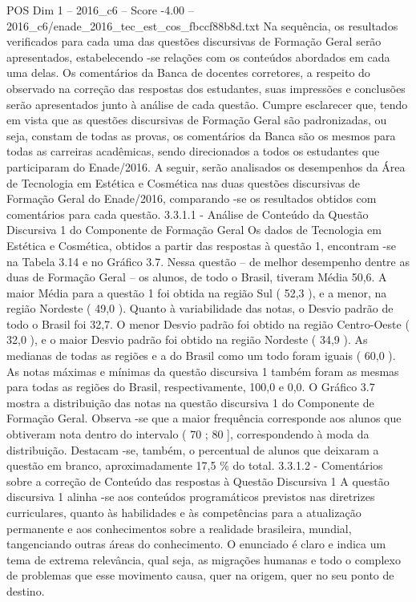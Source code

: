 \begin{textsample}{POS Dim 1 – 2016\_c6 – Score -4.00 – 2016\_c6/enade\_2016\_tec\_est\_cos\_fbccf88b8d.txt}
Na sequência, os resultados verificados para cada uma das questões discursivas de Formação Geral serão apresentados, estabelecendo -se relações com os conteúdos abordados em cada uma delas.
Os comentários da Banca de docentes corretores, a respeito do observado na correção das respostas dos estudantes, suas impressões e conclusões serão apresentados junto à análise de cada questão.
Cumpre esclarecer que, tendo em vista que as questões discursivas de Formação Geral são padronizadas, ou seja, constam de todas as provas, os comentários da Banca são os mesmos para todas as carreiras acadêmicas, sendo direcionados a todos os estudantes que participaram do Enade/2016.
A seguir, serão analisados os desempenhos da Área de Tecnologia em Estética e Cosmética nas duas questões discursivas de Formação Geral do Enade/2016, comparando -se os resultados obtidos com comentários para cada questão. 3.3.1.1 - Análise de Conteúdo da Questão Discursiva 1 do Componente de Formação Geral Os dados de Tecnologia em Estética e Cosmética, obtidos a partir das respostas à questão 1, encontram -se na Tabela 3.14 e no Gráfico 3.7.
Nessa questão – de melhor desempenho dentre as duas de Formação Geral – os alunos, de todo o Brasil, tiveram Média 50,6.
A maior Média para a questão 1 foi obtida na região Sul ( 52,3 ), e a menor, na região Nordeste ( 49,0 ).
Quanto à variabilidade das notas, o Desvio padrão de todo o Brasil foi 32,7.
O menor Desvio padrão foi obtido na região Centro-Oeste ( 32,0 ), e o maior Desvio padrão foi obtido na região Nordeste ( 34,9 ).
As medianas de todas as regiões e a do Brasil como um todo foram iguais ( 60,0 ).
As notas máximas e mínimas da questão discursiva 1 também foram as mesmas para todas as regiões do Brasil, respectivamente, 100,0 e 0,0.
O Gráfico 3.7 mostra a distribuição das notas na questão discursiva 1 do Componente de Formação Geral.
Observa -se que a maior frequência corresponde aos alunos que obtiveram nota dentro do intervalo ( 70 ; 80 ], correspondendo à moda da distribuição.
Destacam -se, também, o percentual de alunos que deixaram a questão em branco, aproximadamente 17,5 \% do total. 3.3.1.2 - Comentários sobre a correção de Conteúdo das respostas à Questão Discursiva 1 A questão discursiva 1 alinha -se aos conteúdos programáticos previstos nas diretrizes curriculares, quanto às habilidades e às competências para a atualização permanente e aos conhecimentos sobre a realidade brasileira, mundial, tangenciando outras áreas do conhecimento.
O enunciado é claro e indica um tema de extrema relevância, qual seja, as migrações humanas e todo o complexo de problemas que esse movimento causa, quer na origem, quer no seu ponto de destino.

\end{textsample}
